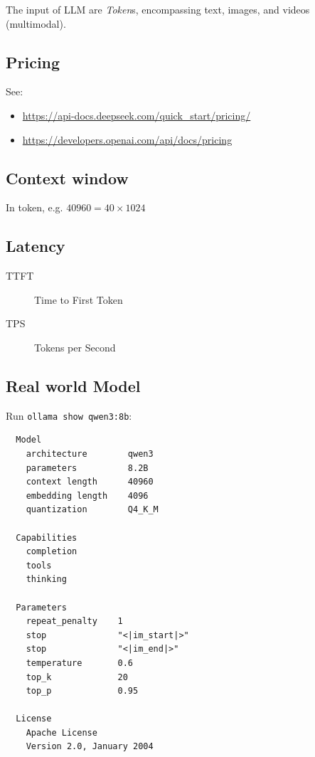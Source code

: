 \documentclass[12pt]{ctexart}
\begin{document}
The input of LLM are \emph{Token}s, encompassing text, images, and videos (multimodal).

\subsection{Pricing}

See:
\begin{itemize}
  \item \url{https://api-docs.deepseek.com/quick_start/pricing/}
  \item \url{https://developers.openai.com/api/docs/pricing}
\end{itemize}

\subsection{Context window}

In token, e.g. $ 40960 = 40 \times 1024 $

\subsection{Latency}

\begin{description}
  \item[TTFT] Time to First Token
  \item[TPS]  Tokens per Second
\end{description}

\subsection{Real world Model}

Run \texttt{ollama show qwen3:8b}:

\begin{verbatim}
  Model
    architecture        qwen3     
    parameters          8.2B      
    context length      40960     
    embedding length    4096      
    quantization        Q4_K_M    

  Capabilities
    completion    
    tools         
    thinking      

  Parameters
    repeat_penalty    1                 
    stop              "<|im_start|>"    
    stop              "<|im_end|>"      
    temperature       0.6               
    top_k             20                
    top_p             0.95              

  License
    Apache License               
    Version 2.0, January 2004    
\end{verbatim}
\end{document}
